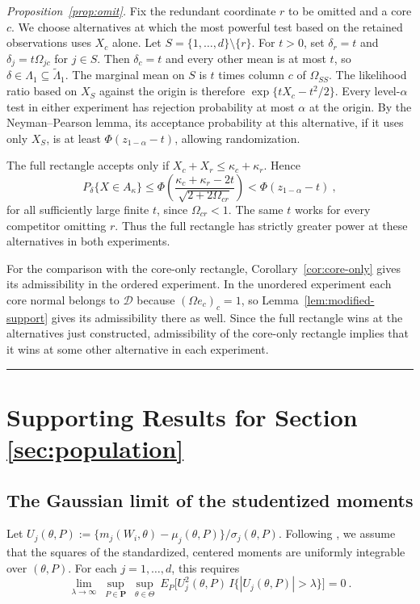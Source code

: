 \documentclass[11pt]{article}
\newcommand{\red}[1]{{\color{red}#1}} %
\numberwithin{equation}{section}
\def\qed{\rule{2mm}{2mm}}
\theoremstyle{definition}
\begin{document}
{\medskip
\noindent\emph{Proposition~\ref{prop:omit}.}
Fix the redundant coordinate $r$ to be omitted and a core $c$. We choose alternatives at which the most powerful test based on the retained observations uses $X_c$ alone. Let $S=\{1,\ldots,d\}\setminus\{r\}$. For $t>0$, set $\delta_r=t$ and $\delta_j=t\Omega_{jc}$ for $j\in S$. Then $\delta_c=t$ and every other mean is at most $t$, so $\delta\in\Lambda_1\subseteq\widetilde\Lambda_1$. The marginal mean on $S$ is $t$ times column $c$ of $\Omega_{SS}$. The likelihood ratio based on $X_S$ against the origin is therefore $\exp\{tX_c-t^2/2\}$. Every level-$\alpha$ test in either experiment has rejection probability at most $\alpha$ at the origin. By the Neyman--Pearson lemma, its acceptance probability at this alternative, if it uses only $X_S$, is at least $\Phi(z_{1-\alpha}-t)$, allowing randomization.

The full rectangle accepts only if $X_c+X_r\le\kappa_c+\kappa_r$. Hence
\[
 P_\delta\{X\in A_\kappa\}
 \le \Phi\!\left(\frac{\kappa_c+\kappa_r-2t}{\sqrt{2+2\Omega_{cr}}}\right)
 <\Phi(z_{1-\alpha}-t)~,
\]
for all sufficiently large finite $t$, since $\Omega_{cr}<1$. The same $t$ works for every competitor omitting $r$. Thus the full rectangle has strictly greater power at these alternatives in both experiments.

For the comparison with the core-only rectangle, Corollary~\ref{cor:core-only} gives its admissibility in the ordered experiment. In the unordered experiment each core normal belongs to $\mathcal D$ because $(\Omega e_c)_c=1$, so Lemma~\ref{lem:modified-support} gives its admissibility there as well. Since the full rectangle wins at the alternatives just constructed, admissibility of the core-only rectangle implies that it wins at some other alternative in each experiment. \qed
}


\section{Supporting Results for Section \ref{sec:population}}\label{app:local-limits}

\subsection{The Gaussian limit of the studentized moments}

Let $U_j(\theta,P):=\{m_j(W_i,\theta)-\mu_j(\theta,P)\}/\sigma_j(\theta,P)$. \red{Following \citet[eq.~(16)]{romano/shaikh/wolf:14}, we assume that the squares of the standardized, centered moments are uniformly integrable over $(\theta,P)$. For each $j=1,\ldots,d$, this requires}
\begin{equation}\label{eq:ui}
\lim_{\lambda\to\infty}\ \sup_{P\in\mathbf P}\ \sup_{\theta\in\Theta}\ E_P\big[U_j^2(\theta,P)\,I\{|U_j(\theta,P)|>\lambda\}\big]=0~.
\end{equation}
\end{document}
